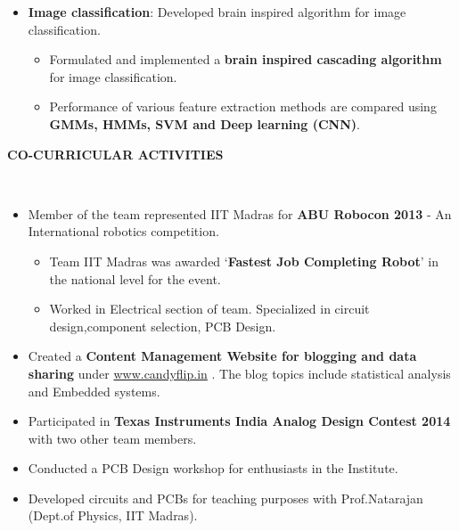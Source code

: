 \documentclass[a4paper,10pt]{article}
\newcommand{\lsep}{-0.5cm}
\newcommand{\resheading}[1]{{\small \colorbox{mygrey}{\begin{minipage}{0.975\textwidth}{\textbf{#1 \vphantom{p\^{E}}}}\end{minipage}}}}
\begin{document}
\begin{itemize}
        \vspace{-5pt}
        \item \textbf{Image classification}: Developed brain inspired algorithm for image classification.
        \begin{itemize}
        \vspace{-5pt}
            \item Formulated and implemented a \textbf{brain inspired cascading algorithm} for image classification.
            \item Performance of various feature extraction methods are compared using \textbf{GMMs, HMMs, SVM and Deep learning (CNN)}.            
        \end{itemize}
    \end{itemize}


\resheading{\textbf{CO-CURRICULAR ACTIVITIES} }\\[\lsep]
    \begin{itemize}
        \item Member of the team represented IIT Madras for \textbf{ABU Robocon 2013} - An International robotics competition.
        \begin{itemize}
            \vspace{-5pt}
            \item Team IIT Madras was awarded `\textbf{Fastest Job Completing Robot}' in the national level for the event.
            \item  Worked in Electrical section of team. Specialized in circuit design,component selection, PCB Design.
        \end{itemize}
        \item Created a \textbf{Content Management Website for blogging and data sharing} under \hspace{3pt}\url{www.candyflip.in} . The blog topics include statistical analysis and Embedded systems.
        \vspace{-5pt}
        \item Participated in \textbf{Texas Instruments India Analog Design Contest 2014} with two other team members.
        \vspace{-5pt}       
        \item Conducted a PCB Design workshop for enthusiasts in the Institute.
        \vspace{-5pt}
        \item Developed circuits and PCBs for teaching purposes with Prof.Natarajan (Dept.of Physics, IIT Madras).
    \end{itemize}
\end{document}
